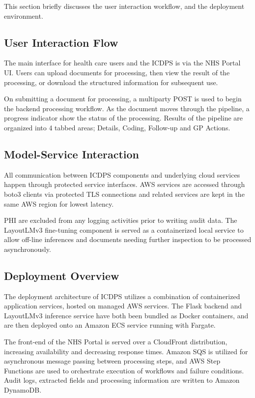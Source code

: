 This section briefly discusses the user interaction workflow, and the deployment environment.

\subsection{User Interaction Flow}

The main interface for health care users and the ICDPS is via the NHS Portal UI. Users can upload documents for processing, then view the result of the processing, or download the structured information for subsequent use.

On submitting a document for processing, a multiparty POST is used to begin the backend processing workflow. As the document moves through the pipeline, a progress indicator show the status of the processing. Results of the pipeline are organized into 4 tabbed areas; Details, Coding, Follow-up and GP Actions.

\subsection{Model-Service Interaction}

All communication between ICDPS components and underlying cloud services happen through protected service interfaces. AWS services are accessed through boto3 clients via protected TLS connections and related services are kept in the same AWS region for lowest latency.

PHI are excluded from any logging activities prior to writing audit data. The LayoutLMv3 fine-tuning component is served as a containerized local service to allow off-line inferences and documents needing further inspection to be processed asynchronously.

\subsection{Deployment Overview}

The deployment architecture of ICDPS utilizes a combination of containerized application services, hosted on managed AWS services. The Flask backend and LayoutLMv3 inference service have both been bundled as Docker containers, and are then deployed onto an Amazon ECS service running with Fargate.

The front-end of the NHS Portal is served over a CloudFront distribution, increasing availability and decreasing response times. Amazon SQS is utilized for asynchronous message passing between processing steps, and AWS Step Functions are used to orchestrate execution of workflows and failure conditions. Audit logs, extracted fields and processing information are written to Amazon DynamoDB.

